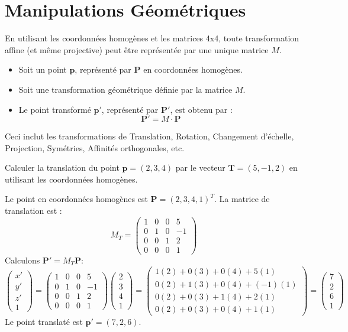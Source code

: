 \section{Manipulations Géométriques}
En utilisant les coordonnées homogènes et les matrices 4x4, toute transformation affine (et même projective) peut être représentée par une unique matrice \( M \).
\begin{itemize}
    \item Soit un point \( \mathbf{p} \), représenté par \( \mathbf{P} \) en coordonnées homogènes.
    \item Soit une transformation géométrique définie par la matrice \( M \).
    \item Le point transformé \( \mathbf{p'} \), représenté par \( \mathbf{P'} \), est obtenu par :
    \[ \mathbf{P'} = M \cdot \mathbf{P} \]
\end{itemize}
Ceci inclut les transformations de Translation, Rotation, Changement d'échelle, Projection, Symétries, Affinités orthogonales, etc.
\begin{example}
Calculer la translation du point \( \mathbf{p} = (2, 3, 4) \) par le vecteur \( \mathbf{T} = (5, -1, 2) \) en utilisant les coordonnées homogènes.
\begin{solution}
Le point en coordonnées homogènes est \( \mathbf{P} = (2, 3, 4, 1)^T \). La matrice de translation est :
\[ M_T = \begin{pmatrix} 1 & 0 & 0 & 5 \\ 0 & 1 & 0 & -1 \\ 0 & 0 & 1 & 2 \\ 0 & 0 & 0 & 1 \end{pmatrix} \]
Calculons \( \mathbf{P'} = M_T \mathbf{P} \):
\[ \begin{pmatrix} x' \\ y' \\ z' \\ 1 \end{pmatrix} = \begin{pmatrix} 1 & 0 & 0 & 5 \\ 0 & 1 & 0 & -1 \\ 0 & 0 & 1 & 2 \\ 0 & 0 & 0 & 1 \end{pmatrix} \begin{pmatrix} 2 \\ 3 \\ 4 \\ 1 \end{pmatrix} = \begin{pmatrix} 1(2) + 0(3) + 0(4) + 5(1) \\ 0(2) + 1(3) + 0(4) + (-1)(1) \\ 0(2) + 0(3) + 1(4) + 2(1) \\ 0(2) + 0(3) + 0(4) + 1(1) \end{pmatrix} = \begin{pmatrix} 7 \\ 2 \\ 6 \\ 1 \end{pmatrix} \]
Le point translaté est \( \mathbf{p'} = (7, 2, 6) \).
\end{solution}
\end{example}
